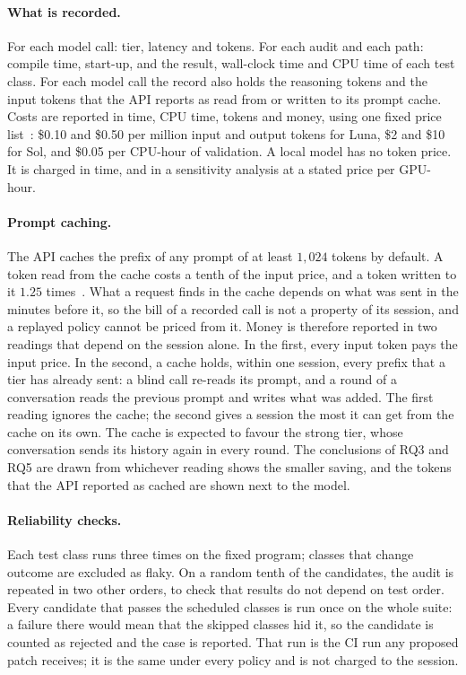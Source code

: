 \paragraph{What is recorded.} For each model call: tier, latency and tokens.
For each audit and each path: compile time, start-up, and the result,
wall-clock time and CPU time of each test class. For each model call the
record also holds the reasoning tokens and the input tokens that the API
reports as read from or written to its prompt cache. Costs are reported in
time, CPU time, tokens and money, using one fixed price
list~\citep{openai2026models}: \$0.10 and \$0.50 per million input and output
tokens for Luna, \$2 and \$10 for Sol, and \$0.05 per CPU-hour of validation.
A local model has no token price. It is charged in time, and in a sensitivity
analysis at a stated price per GPU-hour.

\paragraph{Prompt caching.} The API caches the prefix of any prompt of at
least $1{,}024$ tokens by default. A token read from the cache costs a tenth
of the input price, and a token written to it $1.25$
times~\citep{openai2026caching}. What a request finds in the cache depends on
what was sent in the minutes before it, so the bill of a recorded call is not
a property of its session, and a replayed policy cannot be priced from it.
Money is therefore reported in two readings that depend on the session
alone. In the first, every
input token pays the input price. In the second, a cache holds, within one
session, every prefix that a tier has already sent: a blind call re-reads its
prompt, and a round of a conversation reads the previous prompt and writes
what was added. The first reading ignores the cache; the second gives a
session the most it can get from the cache on its own. The cache is expected
to favour the strong tier, whose conversation sends its history again in
every round. The conclusions of RQ3 and RQ5 are drawn from whichever reading
shows the smaller saving, and the tokens that the API reported as cached are
shown next to the model.

\paragraph{Reliability checks.} Each test class runs three times on the fixed
program; classes that change outcome are excluded as flaky. On a random tenth
of the candidates, the audit is repeated in two other orders, to check that
results do not depend on test order. Every candidate that passes the scheduled
classes is run once on the whole suite: a failure there would mean that the
skipped classes hid it, so the candidate is counted as rejected and the case
is reported. That run is the CI run any proposed patch receives; it is the
same under every policy and is not charged to the session.

